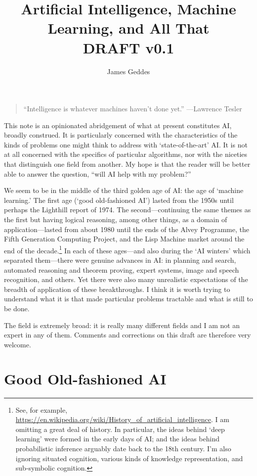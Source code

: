 \documentclass[10pt, a4paper, twocolumn]{article}
\title{Artificial Intelligence, Machine Learning, and All That \\ DRAFT v0.1}
\author{James Geddes}
\begin{document}
\maketitle
\begin{quote}
``Intelligence is whatever machines haven't done yet.'' ---Lawrence Tesler
\end{quote}
This note is an opinionated abridgement of what at present constitutes AI,
broadly construed. It is particularly concerned with the characteristics of the
kinds of problems one might think to address with `state-of-the-art' AI\@. It is
not at all concerned with the specifics of particular algorithms, nor with the
niceties that distinguish one field from another. My hope is that the reader
will be better able to answer the question, ``will AI help with my problem?''

We seem to be in the middle of the third golden age of AI: the age of `machine
learning.' The first age (`good old-fashioned AI') lasted from the 1950s until
perhaps the Lighthill report of 1974. The second---continuing the same themes as
the first but having logical reasoning, among other things, as a domain of
application---lasted from about 1980 until the ends of the Alvey Programme, the
Fifth Generation Computing Project, and the Lisp Machine market around the end
of the decade.\footnote{See, for example,
\url{https://en.wikipedia.org/wiki/History_of_artificial_intelligence}. I am
omitting a great deal of history. In particular, the ideas behind `deep
learning' were formed in the early days of AI; and the ideas behind
probabilistic inference arguably date back to the 18th century. I'm also
ignoring situated cognition, various kinds of knowledge representation, and
sub-symbolic cognition.} In each of these ages---and also during the `AI winters'
which separated them---there were genuine advances in AI: in planning and search,
automated reasoning and theorem proving, expert systems, image and speech
recognition, and others. Yet there were also many unrealistic expectations of
the breadth of application of these breakthroughs. I think it is worth trying to
understand what it is that made particular problems tractable and what is still
to be done.

The field is extremely broad: it is really many different fields and I am not an
expert in any of them. Comments and corrections on this draft are therefore very
welcome.

\section{Good Old-fashioned AI}
\end{document}
